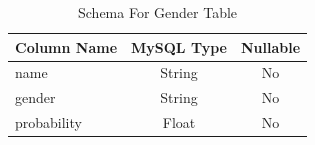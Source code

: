 \documentclass[12pt]{article}
\begin{document}
\begin{table}[h!]
    \begin{center}
        \caption{Schema For Gender Table}
        \label{tab:gen_schema}
        \begin{tabular}{| l |c | c |}
            \hline
            \textbf{Column Name} & \textbf{MySQL Type} & \textbf{Nullable}\\
            \hline
            name & String & No\\
            gender & String & No\\
            probability & Float & No\\
            \hline
        \end{tabular}
    \end{center}
\end{table}
\end{document}
